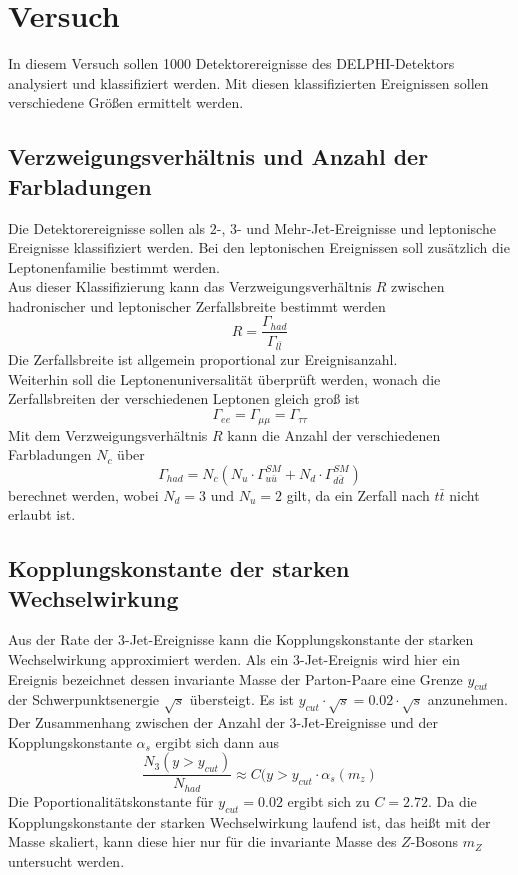 \documentclass{include/thesisclass3}
\newcommand{\cc}{\cdot}
\begin{document}
\chapter{Versuch}
In diesem Versuch sollen 1000 Detektorereignisse des DELPHI-Detektors analysiert und klassifiziert werden. 
Mit diesen klassifizierten Ereignissen sollen verschiedene Größen ermittelt werden.

\section{Verzweigungsverhältnis und Anzahl der Farbladungen}
Die Detektorereignisse sollen als $2$-, $3$- und Mehr-Jet-Ereignisse und leptonische Ereignisse klassifiziert werden. Bei den leptonischen Ereignissen soll zusätzlich die Leptonenfamilie bestimmt werden.\\
Aus dieser Klassifizierung kann das Verzweigungsverhältnis $R$ zwischen hadronischer und leptonischer Zerfallsbreite bestimmt werden
\[ R = \frac{ \Gamma_{had}}{\Gamma_{l\bar l}}\]
Die Zerfallsbreite ist allgemein proportional zur Ereignisanzahl.\\
Weiterhin soll die Leptonenuniversalität überprüft werden, wonach die Zerfallsbreiten der verschiedenen Leptonen gleich groß ist
\[ \Gamma_{ee} = \Gamma_{\mu\mu} = \Gamma_{\tau\tau}\]
Mit dem Verzweigungsverhältnis $R$ kann die Anzahl der verschiedenen Farbladungen $N_c$ über
\[ \Gamma_{had} = N_c \left( N_u \cc \Gamma_{u\bar u}^{SM} + N_d \cc \Gamma_{d \bar d}^{SM}\right)\]
berechnet werden, wobei $N_d = 3$ und $N_u = 2$ gilt, da ein Zerfall nach $t \bar t$ nicht erlaubt ist. 

\section{Kopplungskonstante der starken Wechselwirkung}
Aus der Rate der $3$-Jet-Ereignisse kann die Kopplungskonstante der starken Wechselwirkung approximiert werden. Als ein $3$-Jet-Ereignis wird hier ein Ereignis bezeichnet dessen invariante Masse der Parton-Paare eine Grenze $y_{cut}$ der Schwerpunktsenergie $\sqrt{s}$ übersteigt. Es ist $y_{cut}\cc \sqrt{s} = 0.02 \cc \sqrt{s}$ anzunehmen. Der Zusammenhang zwischen der Anzahl der $3$-Jet-Ereignisse und der Kopplungskonstante $\alpha_s$ ergibt sich dann aus
\[ \frac{N_3(y > y_{cut})}{N_{had}} \approx C(y > y_{cut} \cc \alpha_s(m_z)\]
Die Poportionalitätskonstante für $y_{cut} = 0.02$ ergibt sich zu $C = 2.72$. Da die Kopplungskonstante der starken Wechselwirkung laufend ist, das heißt mit der Masse skaliert, kann diese hier nur für die invariante Masse des $Z$-Bosons $m_Z$ untersucht werden.
\end{document}

